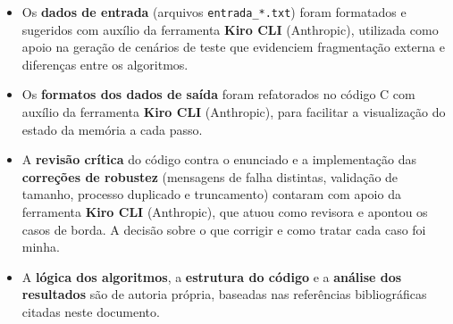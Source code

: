 \documentclass[12pt]{article}
\begin{document}
\begin{itemize}
    \item Os \textbf{dados de entrada} (arquivos \texttt{entrada\_*.txt}) foram formatados e sugeridos com auxílio da ferramenta \textbf{Kiro CLI} (Anthropic), utilizada como apoio na geração de cenários de teste que evidenciem fragmentação externa e diferenças entre os algoritmos.

    \item Os \textbf{formatos dos dados de saída} foram refatorados no código C com auxílio da ferramenta \textbf{Kiro CLI} (Anthropic), para facilitar a visualização do estado da memória a cada passo.

    \item A \textbf{revisão crítica} do código contra o enunciado e a implementação das \textbf{correções de robustez} (mensagens de falha distintas, validação de tamanho, processo duplicado e truncamento) contaram com apoio da ferramenta \textbf{Kiro CLI} (Anthropic), que atuou como revisora e apontou os casos de borda. A decisão sobre o que corrigir e como tratar cada caso foi minha.

    \item A \textbf{lógica dos algoritmos}, a \textbf{estrutura do código} e a \textbf{análise dos resultados} são de autoria própria, baseadas nas referências bibliográficas citadas neste documento.
\end{itemize}

\printbibliography
\end{document}

